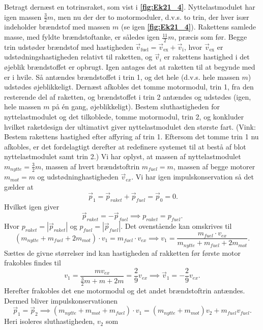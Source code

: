 \documentclass[12pt]{article}
\theoremstyle{definition}
\begin{document}
Betragt dernæst en totrinsraket, som vist i \textbf{\autoref{fig:Ek21_4}}. Nyttelastmodulet har igen massen $\frac{3}{2}m$, men nu der der to motormoduler, d.v.s. to trin, der hver især indeholder brændstof med massen $m$ (se igen \textbf{\autoref{fig:Ek21_4}}). Rakettens samlede masse, med fyldte brændstoftanke, er således igen $\frac{11}{2}m$, præcis som  før.  Begge  trin  udstøder  brændstof  med  hastigheden $\Vec{v}_{\text{fuel}} = \Vec{v}_{\text{ex}} + \Vec{v}_{\text{i}}$, hvor $\Vec{v}_{\text{ex}}$ er udstødningshastigheden relativt til raketten, og $\Vec{v}_{i}$ er rakettens hastighed i det øjeblik brændstoffet er opbrugt. Igen antages det at raketten til at begynde med er i hvile. Så antændes brændstoffet i trin 1, og det hele (d.v.s. hele massen $m$) udstødes øjeblikkeligt. Dernæst afkobles det tomme motormodul, trin 1, fra den resterende del af raketten, og brændstoffet i trin 2 antændes og udstødes (igen, hele massen $m$ på én gang, øjeblikkeligt). Bestem sluthastigheden for nyttelastmodulet og det tilkoblede, tomme motormodul, trin 2, og konkluder hvilket raketdesign der ultimativt giver nyttelastmodulet den største fart. (Vink: Bestem rakettens hastighed efter affyring af trin 1. Eftersom det tomme trin 1 nu afkobles, er det fordelagtigt derefter at redefinere systemet til at bestå af blot nyttelastmodulet samt trin 2.)
\bigbreak
Vi har oplyst, at massen af nyttelastmodulet $m_{nytte} = \frac{3}{2}m$, massen af hvert brændstoftrin $m_{fuel} = m$, massen af begge motorer $m_{mot} = m$ og udstødninghastigheden $\Vec{v}_{ex}$. Vi har igen impulskonservation så det gælder at
\[ 
 \ \Vec{p}_1 = \Vec{p}_{raket} + \Vec{p}_{fuel} = \Vec{p}_0 = 0
.\]
Hvilket igen giver 
\[ 
\Vec{p}_{raket} = -\Vec{p}_{fuel} \implies p_{raket} = p_{fuel}
.\]
Hvor $p_{raket} = |\Vec{p}_{raket}|$ og $p_{fuel} = |\Vec{p}_{fuel}|$. Det ovenstående kan omskrives til
\[ 
  (m_{nytte} + m_{fuel} + 2m_{mot}) \cdot v_{1} = m_{fuel} \cdot v_{ex} \implies v_1 = \frac{m_{fuel}\cdot v_{ex}}{m_{nytte} + m_{fuel} + 2m_{mot}} 
.\]
Sættes de givne størrelser ind kan hastigheden af rakketten før første motor frakobles findes til
\[ 
v_1 = \frac{mv_{ex}}{\frac{3}{2}m  + m+ 2m} = \frac{2}{9} v_{ex} \implies \Vec{v}_1 = - \frac{2}{9}v_{ex}
.\]
Herefter frakobles det ene motormodul og det andet brændstoftrin antændes. Dermed bliver impulskonservationen
\[ 
\Vec{p}_1 = \Vec{p}_2 \implies (m_{nytte} + m_{mot} + m_{fuel})\cdot v_1 = (m_{nytte} + m_{mot})v_2 + m_{fuel}v_{fuel}
.\]
Heri isoleres sluthastigheden, $v_2$ som
\end{document}
